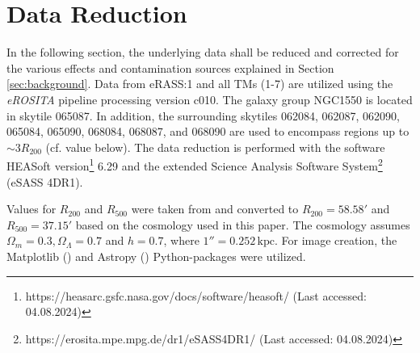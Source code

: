 
\chapter{Data Reduction}
\label{sec:data_reduction}
In the following section, the underlying data shall be reduced and corrected for the various effects and contamination sources explained in Section \ref{sec:background}. Data from eRASS:1 and all TMs (1-7) are utilized using the \textit{eROSITA} pipeline processing version c010. The galaxy group NGC1550 is located in skytile 065087. In addition, the surrounding skytiles 062084, 062087, 062090, 065084, 065090, 068084, 068087, and 068090 are used to encompass regions up to \(\sim 3R_{200}\) (cf. value below). The data reduction is performed with the software HEASoft version\footnote{https://heasarc.gsfc.nasa.gov/docs/software/heasoft/ (Last accessed: 04.08.2024)} 6.29 and the extended Science Analysis Software System\footnote{https://erosita.mpe.mpg.de/dr1/eSASS4DR1/ (Last accessed: 04.08.2024)} (eSASS 4DR1). 

Values for \(R_{200}\) and \(R_{500}\) were taken from \cite{Reiprich_2002} and converted to \(R_{200} = 58.58'\) and \(R_{500} = 37.15'\) based on the cosmology used in this paper. The cosmology assumes \(\Omega_m = 0.3, \Omega_\Lambda = 0.7\) and \(h = 0.7\), where \(1'' = 0.252\,\text{kpc}\). For image creation, the Matplotlib (\cite{Hunter:2007}) and Astropy (\cite{The_Astropy_Collaboration_2022}) Python-packages  were utilized.
